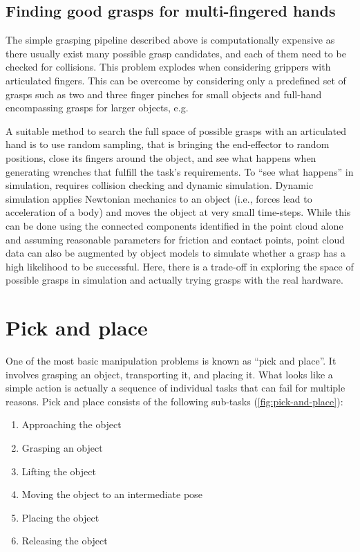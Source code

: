 \subsection{Finding good grasps for multi-fingered hands}

The simple grasping pipeline described above is computationally expensive as there usually exist many possible grasp candidates, and each of them need to be checked for collisions. This problem explodes when considering grippers with articulated fingers. This can be overcome by considering only a predefined set of grasps such as two and three finger pinches for small objects and full-hand encompassing grasps for larger objects, e.g.

A suitable method to search the full space of possible grasps with an articulated hand is to use random sampling, that is bringing the end-effector to random positions, close its fingers around the object, and see what happens when generating wrenches that fulfill the task's requirements.
To ``see what happens'' in simulation, requires collision checking and dynamic simulation. Dynamic simulation applies Newtonian mechanics to an object (i.e., forces lead to acceleration of a body) and moves the object at very small time-steps. While this can be done using the connected components identified in the point cloud alone and assuming reasonable parameters for friction and contact points, point cloud data can also be augmented by object models to simulate whether a grasp has a high likelihood to be successful. Here, there is a trade-off in exploring the space of possible grasps in simulation and actually trying grasps with the real hardware.


\section{Pick and place}
One of the most basic manipulation problems is known as ``pick and place''. It involves grasping an object, transporting it, and placing it. What looks like a simple action is actually a sequence of individual tasks that can fail for multiple reasons. Pick and place consists of the following sub-tasks (\cref{fig:pick-and-place}):

\begin{enumerate}
\item Approaching the object
\item Grasping an object
\item Lifting the object
\item Moving the object to an intermediate pose
\item Placing the object
\item Releasing the object
\end{enumerate}

